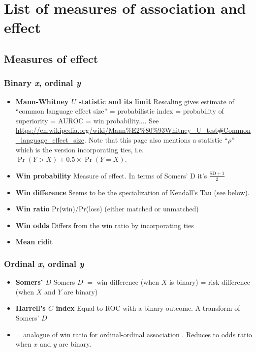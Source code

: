 \documentclass[
  11pt,
  fleqn
]{article}
\begin{document}
\section{List of measures of association and effect}

\subsection{Measures of effect}

\subsubsection{Binary \emph{x}, ordinal \emph{y}}

\begin{itemize}
  \item \textbf{Mann-Whitney $U$ statistic and its limit} Rescaling
    gives estimate of ``common language effect size'' = probabilistic
    index = probability of superiority = AUROC = win probability.... See
    \url{https://en.wikipedia.org/wiki/Mann%E2%80%93Whitney_U_test#Common_language_effect_size}.
      Note that this page also mentions a statistic ``$\rho$''
      which is the version incorporating ties, i.e.~$\Pr(Y > X) +
      0.5 \times \Pr(Y = X)$.
    \item \textbf{Win probability} Measure of effect. In terms of
      Somers' D it's
      $\frac{\text{SD} + 1}{2}$
    \item \textbf{Win difference} Seems to be the specialization of
      Kendall's Tau (see below).
    \item \textbf{Win ratio} Pr(win)/Pr(loss) (either matched or unmatched)
    \item \textbf{Win odds} Differs from the win ratio by incorporating ties
    \item \textbf{Mean ridit}
  \end{itemize}

  \subsubsection{Ordinal \emph{x}, ordinal \emph{y}}

  \begin{itemize}
    \item \textbf{Somers' $D$} \citep{newsonInterpretationSomersFour,
      newsonParametersNonparametricStatistics2002} Somers $D$ $=$ win
      difference (when $X$ is binary) = risk difference (when $X$ and
      $Y$ are binary)
    \item \textbf{Harrell's $C$ index} Equal to ROC with a binary outcome. A
      transform of Somers' $D$
    \item {} = analogue of win
      ratio for ordinal-ordinal association
      \citet{newsonParametersNonparametricStatistics2002}. Reduces to
      odds ratio when $x$ and $y$ are binary.
  \end{itemize}
\end{document}
